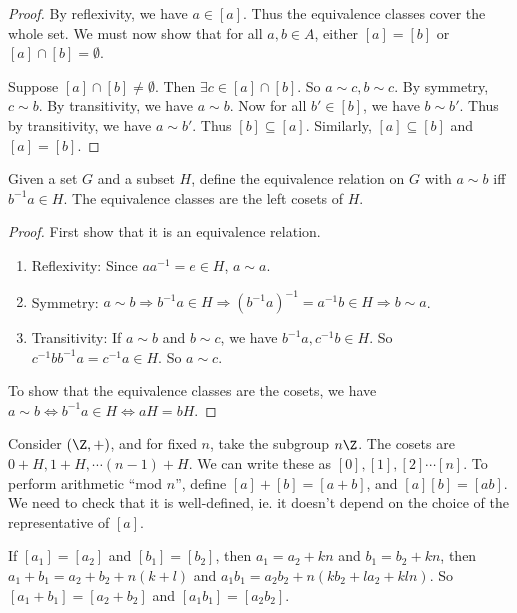 \documentclass[a4paper]{article}
\begin{document}
\begin{proof}
  By reflexivity, we have $a\in [a]$. Thus the equivalence classes cover the whole set. We must now show that for all $a, b\in A$, either $[a] = [b]$ or $[a]\cap [b]=\emptyset$.

  Suppose $[a]\cap[b]\not=\emptyset$. Then $\exists c\in [a]\cap[b]$. So $a\sim c, b\sim c$. By symmetry, $c\sim b$. By transitivity, we have $a\sim b$. Now for all $b'\in [b]$, we have $b\sim b'$. Thus by transitivity, we have $a\sim b'$. Thus $[b]\subseteq[a]$. Similarly, $[a]\subseteq[b]$ and $[a] = [b]$.
\end{proof}

\begin{lemma}
  Given a set $G$ and a subset $H$, define the equivalence relation on $G$ with $a\sim b$ iff $b^{-1}a\in H$. The equivalence classes are the left cosets of $H$.
\end{lemma}

\begin{proof}
  First show that it is an equivalence relation.
  \begin{enumerate}
    \item Reflexivity: Since $aa^{-1} = e\in H$, $a\sim a$.
    \item Symmetry: $a\sim b\Rightarrow b^{-1}a\in H \Rightarrow (b^{-1}a)^{-1} = a^{-1}b\in H\Rightarrow b\sim a$.
    \item Transitivity: If $a\sim b$ and $b\sim c$, we have $b^{-1}a, c^{-1}b\in H$. So $c^{-1}bb^{-1}a = c^{-1}a\in H$. So $a\sim c$.
  \end{enumerate}
  To show that the equivalence classes are the cosets, we have $a\sim b\Leftrightarrow b^{-1}a\in H \Leftrightarrow aH = bH$.
\end{proof}

\begin{eg}
  Consider $(\Z, +)$, and for fixed $n$, take the subgroup $n\Z$. The cosets are $0+ H, 1 + H, \cdots (n - 1)+H$. We can write these as $[0], [1], [2] \cdots [n]$. To perform arithmetic ``mod $n$'', define $[a] + [b] = [a + b]$, and $[a][b] = [ab]$. We need to check that it is well-defined, ie. it doesn't depend on the choice of the representative of $[a]$.

  If $[a_1] = [a_2]$ and $[b_1] = [b_2]$, then $a_1 = a_2 + kn$ and $b_1 = b_2 + kn$, then $a_1 + b_1 = a_2 + b_2 + n(k + l)$ and $a_1b_1 = a_2b_2 + n(kb_2 +la_2 + kln)$. So $[a_1 + b_1] = [a_2 + b_2]$ and $[a_1b_1] = [a_2b_2]$.
\end{eg}
\end{document}
